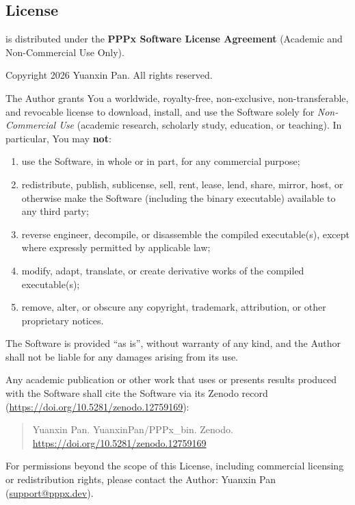 


\subsection{License}

\pppx{} is distributed under the \textbf{PPPx Software License Agreement}
(Academic and Non-Commercial Use Only).

\medskip
\noindent Copyright \textcopyright{} 2026 Yuanxin Pan. All rights reserved.

\medskip
\noindent The Author grants You a worldwide, royalty-free, non-exclusive,
non-transferable, and revocable license to download, install, and use the
Software solely for \emph{Non-Commercial Use} (academic research, scholarly
study, education, or teaching). In particular, You may \textbf{not}:
\begin{enumerate}
    \item use the Software, in whole or in part, for any commercial purpose;
    \item redistribute, publish, sublicense, sell, rent, lease, lend, share,
          mirror, host, or otherwise make the Software (including the binary
          executable) available to any third party;
    \item reverse engineer, decompile, or disassemble the compiled
          executable(s), except where expressly permitted by applicable law;
    \item modify, adapt, translate, or create derivative works of the
          compiled executable(s);
    \item remove, alter, or obscure any copyright, trademark, attribution,
          or other proprietary notices.
\end{enumerate}

\noindent The Software is provided ``as is'', without warranty of any kind,
and the Author shall not be liable for any damages arising from its use.

\medskip
\noindent Any academic publication or other work that uses or presents
results produced with the Software shall cite the Software via its Zenodo
record (\href{https://doi.org/10.5281/zenodo.12759169}{https://doi.org/10.5281/zenodo.12759169}):

\begin{quote}
    Yuanxin Pan. YuanxinPan/PPPx\_bin. Zenodo.
    \href{https://doi.org/10.5281/zenodo.12759169}{https://doi.org/10.5281/zenodo.12759169}
\end{quote}

\noindent For permissions beyond the scope of this License, including
commercial licensing or redistribution rights, please contact the Author:
Yuanxin Pan (\href{mailto:support@pppx.dev}{support@pppx.dev}).
